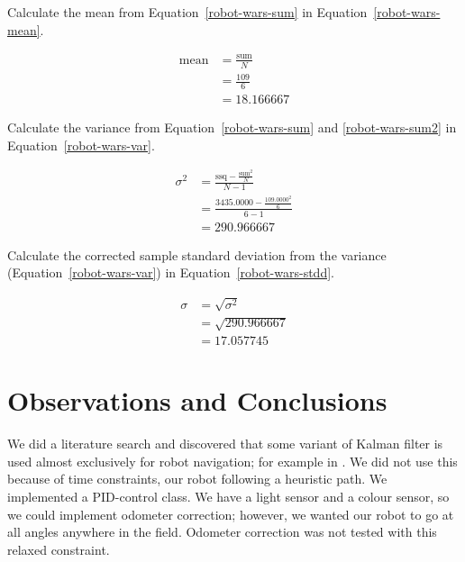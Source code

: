 \documentclass[twocolumn]{article}
\begin{document}
Calculate the mean from Equation~\ref{robot-wars-sum} in Equation~\ref{robot-wars-mean}.

\begin{align}
\text{mean} &= \frac{\text{sum}}{N} \nonumber\\
 &= \frac{109}{6} \nonumber\\
 &= 18.166667 \label{robot-wars-mean}
\end{align}

Calculate the variance from Equation~\ref{robot-wars-sum} and \ref{robot-wars-sum2} in Equation~\ref{robot-wars-var}.

\begin{align}
\sigma^{2} &= \frac{\text{ssq} - \frac{\text{sum}^{2}}{N}}{N-1} \nonumber\\
 &= \frac{3435.0000 - \frac{109.0000^2}{6}}{6-1} \nonumber\\
 &= 290.966667 \label{robot-wars-var}
\end{align}

Calculate the corrected sample standard deviation from the variance (Equation~\ref{robot-wars-var}) in Equation~\ref{robot-wars-stdd}.

\begin{align}
\sigma &= \sqrt{\sigma^{2}} \nonumber\\
 &= \sqrt{290.966667} \nonumber\\
 &= 17.057745 \label{robot-wars-stdd}
\end{align}

\section{Observations and Conclusions}

We did a literature search and discovered that some variant of Kalman filter is used almost exclusively for robot navigation; for example in \cite{davison2003real}. We did not use this because of time constraints, our robot following a heuristic path. We implemented a PID-control class. We have a light sensor and a colour sensor, so we could implement odometer correction; however, we wanted our robot to go at all angles anywhere in the field. Odometer correction was not tested with this relaxed constraint.
\end{document}
